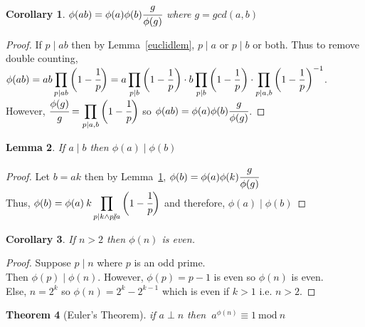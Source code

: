 \documentclass[12pt]{extarticle}
\renewcommand\qedsymbol{$\square$}
\newcommand{\divides}{\mid}
\newcommand{\ndivides}{\centernot \mid}
\newtheorem{theorem}{Theorem}[section]
\newtheorem{lemma}[theorem]{Lemma}
\newtheorem{corollary}[theorem]{Corollary}
\newenvironment{lproof}{\begin{proof} \renewcommand{\qedsymbol}{}}{\end{proof}}
\renewcommand{\mod}[3]{\: #1 \equiv #2 \: \mathrm{mod} \: #3 \:}
\begin{document}
\newpage

\begin{corollary}
\label{phidivison}
$\phi (ab) = \phi (a) \phi (b) \cfrac{g}{\phi(g)}$ where $g = gcd(a,b)$
\end{corollary}

\begin{lproof}
If $p \divides ab$ then by Lemma~\ref{euclidlem}, $p \divides a$ or $p \divides b$ or both. Thus to remove double counting, $\phi (ab) = ab \displaystyle\prod \limits_{p \divides ab} \bigg(1-\cfrac{1}{p}\bigg) = a \prod \limits_{p \divides b} \bigg(1-\frac{1}{p}\bigg) \cdot b \prod \limits_{p \divides b} \bigg(1-\frac{1}{p}\bigg) \cdot \prod \limits_{p \divides a,b} \bigg(1-\frac{1}{p}\bigg)^{-1}$. \\
However, $\displaystyle\cfrac{\phi (g)}{g} =  \displaystyle\prod \limits_{p \divides a,b} \bigg(1-\cfrac{1}{p}\bigg)$ so $\phi (ab) = \phi (a) \phi (b) \cfrac{g}{\phi(g)}$.
\end{lproof}

\begin{lemma}
If $a \divides b$ then $\phi (a) \divides \phi (b)$
\end{lemma}

\begin{lproof}
Let $b = ak$ then by Lemma~\ref{phidivison}, $\phi (b) = \phi (a) \phi (k) \cfrac{g}{\phi(g)}$ \\ Thus, $\phi (b) = \phi (a) \: k \displaystyle\prod \limits_{p \divides k \wedge p \ndivides a} \bigg(1-\cfrac{1}{p}\bigg)$ and therefore, $\phi (a) \divides \phi (b)$
\end{lproof}

\begin{corollary}
\label{phieven}
If $n > 2$ then $\phi (n)$ is even.
\end{corollary}

\begin{lproof}
Suppose $p \divides n$ where $p$ is an odd prime. \\ Then $\phi (p) \divides \phi (n)$.  However, $\phi (p) = p-1$ is even so $\phi (n)$ is even. \\ Else, $n = 2^k$ so $\phi (n) = 2^k - 2^{k-1}$ which is even if $k > 1$ i.e. $n > 2$.
\end{lproof}

\begin{theorem}[Euler's Theorem]
if $a \perp n$ then $\mod{a^{\phi (n)}}{1}{n}$
\end{theorem}
\end{document}
